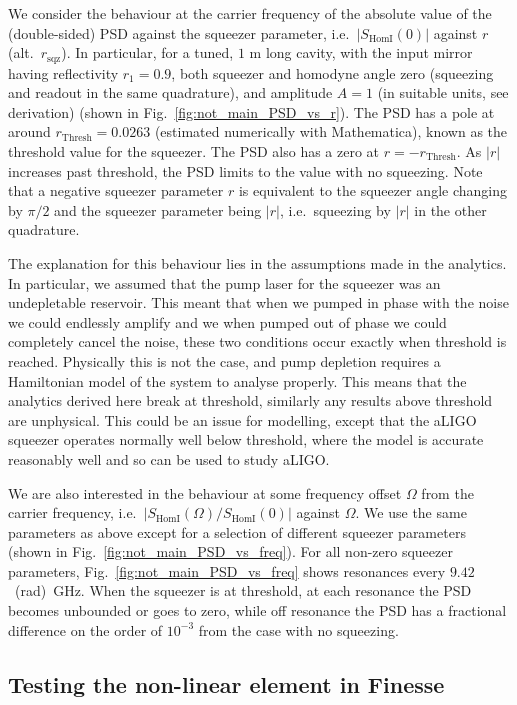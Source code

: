 \documentclass[aps,pra,superscriptaddress,reprint,nofootinbib]{revtex4-1}
\newcommand{\abs}[1]{\left\lvert #1 \right\rvert}
\begin{document}
We consider the behaviour at the carrier frequency of the absolute value of the (double-sided) PSD against the squeezer parameter, i.e.\ $\abs{S_{\mathrm{HomI}}(0)}$ against $r$ (alt.\ $r_\mathrm{sqz}$). In particular, for a tuned, $1$ m long cavity, with the input mirror having reflectivity $r_1 = 0.9$, both squeezer and homodyne angle zero (squeezing and readout in the same quadrature), and amplitude $A = 1$ (in suitable units, see derivation) (shown in Fig.~\ref{fig:not_main_PSD_vs_r}). The PSD has a pole at around $r_\mathrm{Thresh} = 0.0263$ (estimated numerically with Mathematica), known as the threshold value for the squeezer. The PSD also has a zero at $r = -r_\mathrm{Thresh}$. As $\abs{r}$ increases past threshold, the PSD limits to the value with no squeezing. Note that a negative squeezer parameter $r$ is equivalent to the squeezer angle changing by $\pi/2$ and the squeezer parameter being $\abs{r}$, i.e.\ squeezing by $\abs{r}$ in the other quadrature.


The explanation for this behaviour lies in the assumptions made in the analytics. In particular, we assumed that the pump laser for the squeezer was an undepletable reservoir. This meant that when we pumped in phase with the noise we could endlessly amplify and we when pumped out of phase we could completely cancel the noise, these two conditions occur exactly when threshold is reached. Physically this is not the case, and pump depletion requires a Hamiltonian model of the system to analyse properly. This means that the analytics derived here break at threshold, similarly any results above threshold are unphysical.
This could be an issue for modelling, except that the aLIGO squeezer operates normally well below threshold, where the model is  accurate reasonably well and so can be used to study aLIGO.


We are also interested in the behaviour at some frequency offset $\Omega$ from the carrier frequency, i.e.\ $\abs{S_{\mathrm{HomI}}(\Omega)/S_{\mathrm{HomI}}(0)}$ against $\Omega$. We use the same parameters as above except for a selection of different squeezer parameters (shown in Fig.~\ref{fig:not_main_PSD_vs_freq}). For all non-zero squeezer parameters, Fig.~\ref{fig:not_main_PSD_vs_freq} shows resonances every $9.42$~(rad)~GHz. When the squeezer is at threshold, at each resonance the PSD becomes unbounded or goes to zero, while off resonance the PSD has a fractional difference on the order of $10^{-3}$ from the case with no squeezing.


\subsection{Testing the non-linear element in Finesse}
\end{document}
